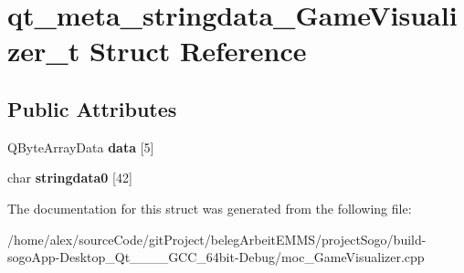 \hypertarget{structqt__meta__stringdata__GameVisualizer__t}{\section{qt\-\_\-meta\-\_\-stringdata\-\_\-\-Game\-Visualizer\-\_\-t Struct Reference}
\label{structqt__meta__stringdata__GameVisualizer__t}
}
\subsection*{Public Attributes}
\begin{DoxyCompactItemize}
\item 
\hypertarget{structqt__meta__stringdata__GameVisualizer__t_a94a7fd8541d646bcf8046d87c3ac606c}{Q\-Byte\-Array\-Data {\bfseries data} \mbox{[}5\mbox{]}}\label{structqt__meta__stringdata__GameVisualizer__t_a94a7fd8541d646bcf8046d87c3ac606c}

\item 
\hypertarget{structqt__meta__stringdata__GameVisualizer__t_ad222cbb6adc071bf839ed33c132e05e5}{char {\bfseries stringdata0} \mbox{[}42\mbox{]}}\label{structqt__meta__stringdata__GameVisualizer__t_ad222cbb6adc071bf839ed33c132e05e5}

\end{DoxyCompactItemize}


The documentation for this struct was generated from the following file\-:\begin{DoxyCompactItemize}
\item 
/home/alex/source\-Code/git\-Project/beleg\-Arbeit\-E\-M\-M\-S/project\-Sogo/build-\/sogo\-App-\/\-Desktop\-\_\-\-Qt\-\_\-\_\-\_\-\_\-\-G\-C\-C\-\_\-64bit-\/\-Debug/moc\-\_\-\-Game\-Visualizer.\-cpp\end{DoxyCompactItemize}
